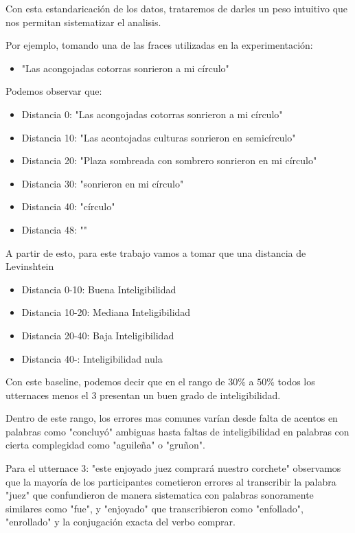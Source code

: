 Con esta estandaricación de los datos, trataremos de darles un peso intuitivo que nos permitan sistematizar el analisis.

Por ejemplo, tomando una de las fraces utilizadas en la experimentación: 

\begin{itemize}
	\item "Las acongojadas cotorras sonrieron a mi círculo"
\end{itemize}

Podemos observar que:

\begin{itemize}
	\item Distancia 0: "Las acongojadas cotorras sonrieron a mi círculo"
	\item Distancia 10: "Las acontojadas culturas sonrieron en semicírculo"
	\item Distancia 20: "Plaza sombreada con sombrero sonrieron en mi círculo"
	\item Distancia 30: "sonrieron en mi círculo"
	\item Distancia 40: "círculo"
	\item Distancia 48: ""
\end{itemize}

A partir de esto, para este trabajo vamos a tomar que una distancia de Levinshtein

\begin{itemize}
	\item Distancia 0-10: Buena Inteligibilidad
	\item Distancia 10-20: Mediana Inteligibilidad
	\item Distancia 20-40: Baja Inteligibilidad
	\item Distancia 40-: Inteligibilidad nula
\end{itemize}

Con este baseline, podemos decir que en el rango de $30\%$ a $50\%$ todos los utternaces menos el 3 presentan un buen grado de inteligibilidad.

Dentro de este rango, los errores mas comunes varían desde falta de acentos en palabras como "concluyó" ambiguas hasta faltas de inteligibilidad en palabras con cierta complegidad como "aguileña" o "gruñon".

Para el utternace 3: "este enjoyado juez comprará nuestro corchete" observamos que la mayoría de los participantes cometieron errores al transcribir la palabra "juez" que confundieron de manera sistematica con palabras sonoramente similares como "fue", y "enjoyado" que transcribieron como "enfollado", "enrollado" y la conjugación exacta del verbo comprar.

